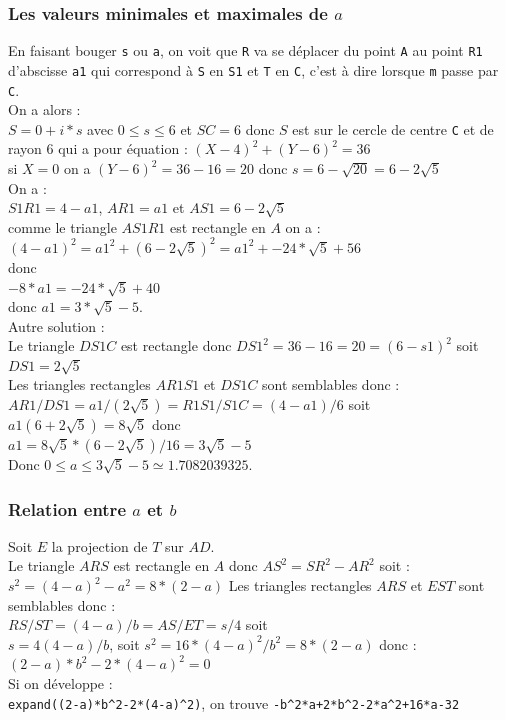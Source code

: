 \documentclass[a4paper,11pt]{book}
\begin{document}
\subsubsection{Les valeurs minimales et maximales de $a$}
En faisant bouger {\tt s} ou {\tt a}, on voit que {\tt R} va se d\'eplacer du 
point {\tt A}
 au point {\tt R1} d'abscisse {\tt a1} qui correspond \`a {\tt S} en {\tt S1}
et {\tt T} en {\tt C}, c'est \`a dire lorsque {\tt m} passe par {\tt C}.\\ 
On a alors :\\
$S=0+i*s$ avec $0 \leq s \leq 6$ et $SC=6$ donc $S$ est sur le cercle de centre
{\tt C} et de rayon 6 qui a pour \'equation : $(X-4)^2+(Y-6)^2=36$\\
si $X=0$ on a $(Y-6)^2=36-16=20$ donc $s=6-\sqrt{20}=6-2\sqrt 5$\\
On a :\\
$S1R1=4-a1$, $AR1=a1$ et $AS1=6-2\sqrt 5$\\
comme le triangle $AS1R1$ est rectangle en $A$ on a :\\
$(4-a1)^2=a1^2+(6-2\sqrt 5)^2=a1^2+-24*\sqrt 5+56$\\
donc\\
$-8*a1=-24*\sqrt 5+40$\\
donc $a1=3*\sqrt 5-5$.\\
Autre solution :\\
Le triangle $DS1C$ est rectangle donc $DS1^2=36-16=20=(6-s1)^2$ soit 
$DS1=2\sqrt 5$\\
Les triangles rectangles $AR1S1$ et $DS1C$ sont semblables donc :\\
$AR1/DS1=a1/(2\sqrt 5)=R1S1/S1C=(4-a1)/6$ soit\\
$a1(6+2\sqrt 5)=8\sqrt 5$ donc\\
$a1=8\sqrt 5*(6-2\sqrt 5)/16=3\sqrt 5-5$\\
Donc $0 \leq a \leq 3\sqrt 5-5 \simeq 1.7082039325$.\\

\subsubsection{Relation entre $a$ et $b$}
Soit $E$ la projection de $T$ sur $AD$.\\
Le triangle $ARS$ est rectangle en $A$ donc $AS^2=SR^2-AR^2$ soit :\\
$s^2=(4-a)^2-a^2=8*(2-a)$
Les triangles rectangles $ARS$ et $EST$ sont semblables donc :\\
$RS/ST=(4-a)/b=AS/ET=s/4$ soit\\
$s=4(4-a)/b$, soit $s^2=16*(4-a)^2/b^2=8*(2-a)$ donc :\\
$(2-a)*b^2-2*(4-a)^2=0$\\
Si on d\'eveloppe :\\
{\tt expand((2-a)*b\verb|^|2-2*(4-a)\verb|^|2)}, on trouve
{\tt -b\verb|^|2*a+2*b\verb|^|2-2*a\verb|^|2+16*a-32}
\end{document}
